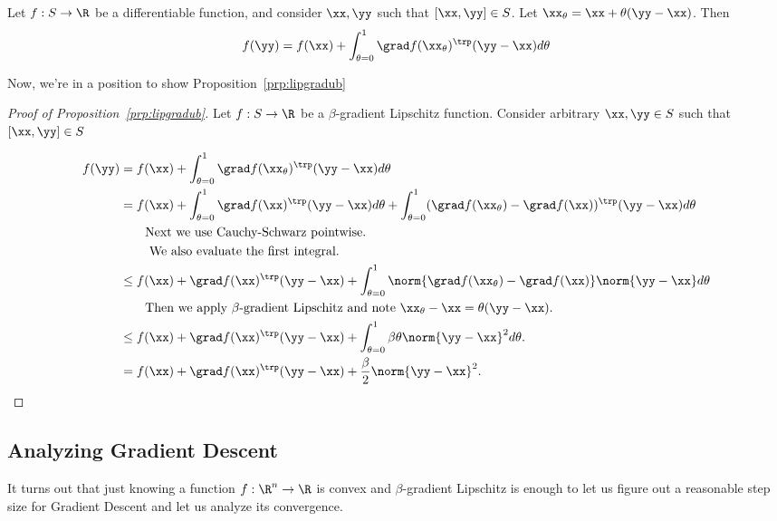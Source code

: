\begin{proposition}
  Let $f: S \to \R$ be a differentiable function, and consider
  $\xx, \yy$ such that $[\xx,\yy] \in S$.
  Let ${\xx_{\theta} = \xx + \theta (\yy - \xx)}$.
  Then
  \[
    f(\yy) = f(\xx) + \int_{\theta = 0}^1 \grad f(\xx_{\theta})^\trp (\yy-\xx) d\theta
    \]
\end{proposition}
Now, we're in a position to show Proposition~\ref{prp:lipgradub}
\begin{proof}[Proof of Proposition~\ref{prp:lipgradub}]
  Let $f: S \to \R$ be a $\beta$-gradient Lipschitz function.
  Consider arbitrary $\xx, \yy \in S$ such that $[\xx,\yy] \in S$

  \begin{align*}
    f(\yy)
    &= f(\xx) + \int_{\theta = 0}^1 \grad
      f(\xx_{\theta})^\trp(\yy-\xx) d\theta
    \\
    &= f(\xx)
     + \int_{\theta = 0}^1 \grad
      f(\xx)^\trp(\yy-\xx) d\theta
      + \int_{\theta = 0}^1
      (\grad f(\xx_{\theta}) - \grad f(\xx ))^\trp(\yy-\xx) d\theta
   \\
    &         \tag*{Next we use Cauchy-Schwarz pointwise.}
 \\
    &\tag*{ We also evaluate the
      first integral.}
    \\
    &\leq f(\xx)
     + \grad f(\xx)^\trp(\yy-\xx)
      + \int_{\theta = 0}^1
      \norm{ \grad f(\xx_{\theta}) - \grad f(\xx ) } \norm{\yy-\xx}
      d\theta
    \\
    &\tag*{Then we apply $\beta$-gradient Lipschitz and note
      $\xx_\theta -\xx = \theta (\yy-\xx)$.}
    \\
    &\leq f(\xx)
     + \grad f(\xx)^\trp(\yy-\xx)
      + \int_{\theta = 0}^1
    \beta \theta \norm{\yy-\xx}^2
      d\theta
      .
      \\
    &= f(\xx)
     + \grad f(\xx)^\trp(\yy-\xx)
      + \frac{\beta}{2} \norm{\yy-\xx}^2
      .
  \end{align*}
\end{proof}

\subsection{Analyzing Gradient Descent}
It turns out that just knowing a function $f: \R^n \to \R$ is convex
and $\beta$-gradient Lipschitz is enough to let us figure out a reasonable
step size for Gradient Descent and let us analyze its convergence.

